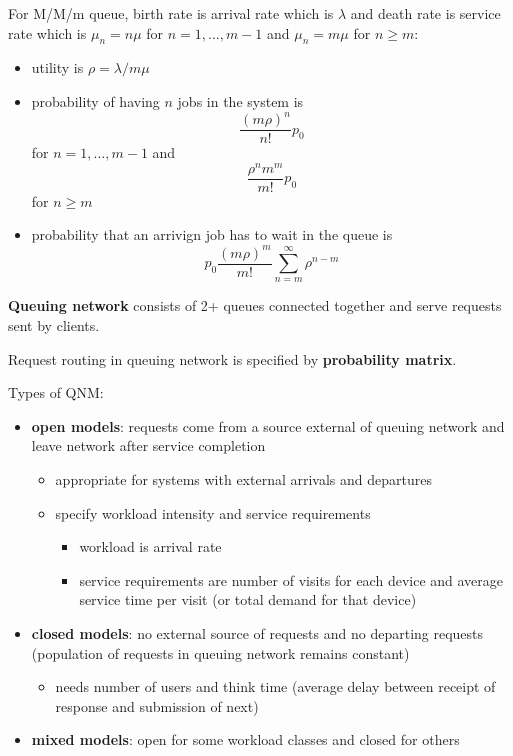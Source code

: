 \documentclass[11pt]{article}
\begin{document}
For M/M/m queue, birth rate is arrival rate which is \(\lambda\) and
death rate is service rate which is
\(\mu_{n} = n \mu\) for \(n = 1, \dots, m-1\) and \(\mu_{n} = m \mu\) for \(n \ge m\):
\begin{itemize}
\item utility is \(\rho = \lambda / m \mu\)
\item probability of having \(n\) jobs in the system is
$$ \frac{(m \rho)^{n}}{n!} p_{0} $$ for \(n = 1, \dots, m-1\)
and $$ \frac{\rho^{n} m^{m}}{m!} p_{0} $$ for \(n \ge m\)
\item probability that an arrivign job has to wait in the queue is
$$ p_{0} \frac{(m \rho)^{m}}{m!} \sum_{n=m}^{\infty} \rho^{n-m} $$
\end{itemize}

\textbf{Queuing network} consists of 2+ queues connected together and serve requests
sent by clients.

Request routing in queuing network is specified by \textbf{probability matrix}.

Types of QNM:
\begin{itemize}
\item \textbf{open models}: requests come from a source external of queuing network and leave
network after service completion
\begin{itemize}
\item appropriate for systems with external arrivals and departures
\item specify workload intensity and service requirements
\begin{itemize}
\item workload is arrival rate
\item service requirements are number of visits for each device and average
service time per visit (or total demand for that device)
\end{itemize}
\end{itemize}
\item \textbf{closed models}: no external source of requests and no departing requests (population
of requests in queuing network remains constant)
\begin{itemize}
\item needs number of users and think time (average delay between receipt of response
and submission of next)
\end{itemize}
\item \textbf{mixed models}: open for some workload classes and closed for others
\end{itemize}
\end{document}

